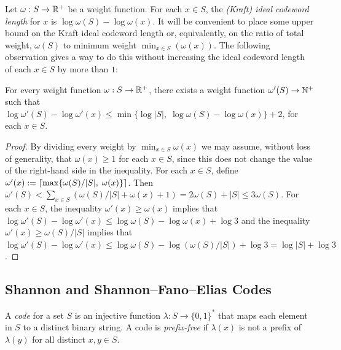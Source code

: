 \documentclass{patmorin}
\renewcommand{\ge}{\geqslant}
\renewcommand{\le}{\leqslant}
\newcommand{\defin}[1]{\emph{\textcolor{brightmaroon}{#1}}}
\DeclarePairedDelimiter{\ceil}{\lceil}{\rceil}
\begin{document}
  Let $\omega:S\to\mathbb{R}^+$ be a weight function.  For each $x\in S$, the \defin{(Kraft) ideal codeword length} for $x$ is $\log\omega(S)-\log\omega(x)$.
  It will be convenient to place some upper bound on the Kraft ideal codeword length or, equivalently, on the ratio of total weight, $\omega(S)$ to minimum weight $\min_{x\in S}(\omega(x))$.  The following observation gives a way to do this without increasing the ideal codeword length of each $x\in S$ by more than $1$:

  \begin{obs}\label{obs:nice}
    For every weight function $\omega:S\to\mathbb{R}^+$, there exists a weight function $\omega'(S)\to\mathbb{N}^+$ such that $\log\omega'(S)-\log\omega'(x)\le\min\{\log|S|,\;\log\omega(S)-\log\omega(x)\}+2$, for each $x\in S$.
  \end{obs}

  \begin{proof}
    By dividing every weight by $\min_{x\in S}\omega(x)$ we may assume, without loss of generality, that $\omega(x)\ge 1$ for each $x\in S$, since this does not change the value of the right-hand side in the inequality.
    For each $x\in S$, define $\omega'(x):=\ceil{\max\{\omega(S)/|S|,\; \omega(x)\}}$.  Then $\omega'(S)<\sum_{x\in S}(\omega(S)/|S|+\omega(x)+1)= 2\omega(S)+|S|\le 3\omega(S)$.  For each $x\in S$, the inequality $\omega'(x)\ge \omega(x)$ implies that $\log\omega'(S)-\log\omega'(x)\le\log \omega(S)-\log\omega(x)+\log 3$ and the inequality $\omega'(x)\ge \omega(S)/|S|$ implies that $\log\omega'(S)-\log\omega'(x)\le \log\omega(S)-\log(\omega(S)/|S|) + \log 3 = \log|S| + \log 3$.
  \end{proof}

  \subsection{Shannon and Shannon--Fano--Elias Codes}

  A \defin{code} for a set $S$ is an injective function $\lambda:S\to\{0,1\}^*$ that maps each element in $S$ to a distinct binary string.  A code is \defin{prefix-free} if $\lambda(x)$ is not a prefix of $\lambda(y)$ for all distinct $x,y\in S$.

\end{document}
